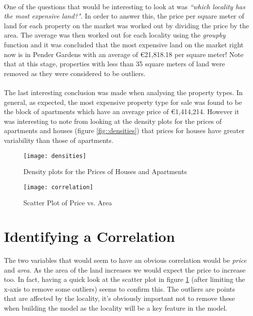 \paragraph{ }One of the questions that would be interesting to look at was \textit{``which locality has the most expensive land?"}. In order to answer this, the price per square meter of land for each property on the market was worked out by dividing the price by the area. The average was then worked out for each locality using the \textit{groupby} function and it was concluded that the most expensive land on the market right now is in Pender Gardens with an average of \euro 21,818.18 per square meter! Note that at this stage, properties with less than 35 square meters of land were removed as they were considered to be outliers.

\paragraph{ }The last interesting conclusion was made when analysing the property types. In general, as expected, the most expensive property type for sale was found to be the block of apartments which have an average price of \euro1,414,214. However it was interesting to note from looking at the density plots for the prices of apartments and houses (figure \ref{fig::densities}) that prices for houses have greater variability than those of apartments. 

\begin{figure}[!t]
	\begin{minipage}[b]{0.45\linewidth}
		\centering
		\texttt{[image: densities]}
		\caption[Price Densities]{Density plots for the Prices of Houses and Apartments}
		\label{fig::densities}
	\end{minipage}	
	\hspace{0.5cm}
	\begin{minipage}[b]{0.45\linewidth}
		\centering
		\texttt{[image: correlation]}
		\caption[Correlation Plot]{Scatter Plot of Price vs. Area}
		\label{fig::correlation}
	\end{minipage}	
\end{figure}


\section{Identifying a Correlation}
\paragraph{ }The two variables that would seem to have an obvious correlation would be \textit{price} and \textit{area}. As the area of the land increases we would expect the price to increase too. In fact, having a quick look at the scatter plot in figure \ref{fig::correlation} (after limiting the x-axis to remove some outliers) seems to confirm this. The outliers are points that are affected by the locality, it's obviously important not to remove these when building the model as the locality will be a key feature in the model.

